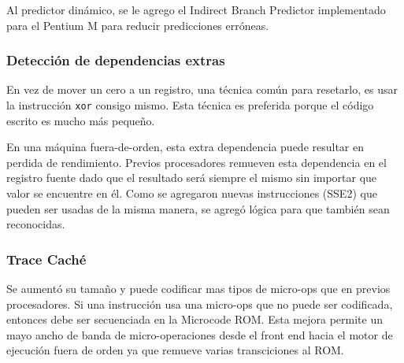 Al predictor dinámico, se le agrego el Indirect Branch Predictor implementado para el Pentium M para reducir predicciones erróneas.

\subsubsection{Detección de dependencias extras}
En vez de mover un cero a un registro, una técnica común para resetarlo, es usar la instrucción \texttt{xor} consigo mismo. Esta técnica es preferida porque el código escrito es mucho más pequeño.

En una máquina fuera-de-orden, esta extra dependencia puede resultar en perdida de rendimiento. Previos procesadores remueven esta dependencia en el registro fuente dado que el resultado será siempre el mismo sin importar que valor se encuentre en él. Como se agregaron nuevas instrucciones (SSE2) que pueden ser usadas de la misma manera, se agregó lógica para que también sean reconocidas.

\subsubsection{Trace Caché}
Se aumentó su tamaño y puede codificar mas tipos de micro-ops que en previos procesadores. Si una instrucción usa una micro-ops que no puede ser codificada, entonces debe ser secuenciada en la Microcode ROM. Esta mejora permite un mayo ancho de banda de micro-operaciones desde el front end hacia el motor de ejecución fuera de orden ya que remueve varias transciciones al ROM.

